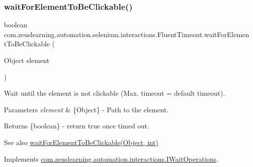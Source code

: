 \subsubsection{\texorpdfstring{wait\+For\+Element\+To\+Be\+Clickable()}{waitForElementToBeClickable()}\hspace{0.1cm}{\footnotesize\ttfamily [1/2]}}
{\footnotesize\ttfamily boolean com.\+zeuslearning.\+automation.\+selenium.\+interactions.\+Fluent\+Timeout.\+wait\+For\+Element\+To\+Be\+Clickable (\begin{DoxyParamCaption}\item[{Object}]{element }\end{DoxyParamCaption})\hspace{0.3cm}{\ttfamily [inline]}}

Wait until the element is not clickable (Max. timeout = default timeout).


\begin{DoxyParams}{Parameters}
{\em element} & \{Object\} -\/ Path to the element.\\
\hline
\end{DoxyParams}
\begin{DoxyReturn}{Returns}
\{boolean\} -\/ return {\ttfamily true} once timed out.
\end{DoxyReturn}
\begin{DoxySeeAlso}{See also}
\hyperlink{classcom_1_1zeuslearning_1_1automation_1_1selenium_1_1interactions_1_1FluentTimeout_adce608907ac37820819c4e4f7120c733}{wait\+For\+Element\+To\+Be\+Clickable(\+Object, int)} 
\end{DoxySeeAlso}


Implements \hyperlink{interfacecom_1_1zeuslearning_1_1automation_1_1interactions_1_1IWaitOperations_a224899aff622d5bbc4f7e76761413dc9}{com.\+zeuslearning.\+automation.\+interactions.\+I\+Wait\+Operations}.

\hypertarget{classcom_1_1zeuslearning_1_1automation_1_1selenium_1_1interactions_1_1FluentTimeout_adce608907ac37820819c4e4f7120c733}{}\label{classcom_1_1zeuslearning_1_1automation_1_1selenium_1_1interactions_1_1FluentTimeout_adce608907ac37820819c4e4f7120c733} 
